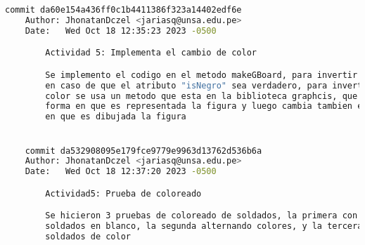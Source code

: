 \begin{lstlisting}[language=bash, caption={commits mas importantes}]
    commit da60e154a436ff0c1b4411386f323a14402edf6e
    Author: JhonatanDczel <jariasq@unsa.edu.pe>
    Date:   Wed Oct 18 12:35:23 2023 -0500

        Actividad 5: Implementa el cambio de color

        Se implemento el codigo en el metodo makeGBoard, para invertir el color
        en caso de que el atributo "isNegro" sea verdadero, para invertir el
        color se usa un metodo que esta en la biblioteca graphcis, que cambia la
        forma en que es representada la figura y luego cambia tambien el color
        en que es dibujada la figura


    commit da532908095e179fce9779e9963d13762d536b6a
    Author: JhonatanDczel <jariasq@unsa.edu.pe>
    Date:   Wed Oct 18 12:37:20 2023 -0500

        Actividad5: Prueba de coloreado

        Se hicieron 3 pruebas de coloreado de soldados, la primera con los
        soldados en blanco, la segunda alternando colores, y la tercera con los
        soldados de color

    \end{lstlisting}
